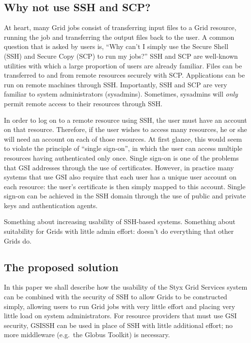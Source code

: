 \documentclass[a4paper]{article}
\begin{document}
\begin{multicols}{2}
\subsection{Why not use SSH and SCP?}
At heart, many Grid jobs consist of transferring input files to a Grid resource, running the job and transferring the output files back to the user.  A common question that is asked by users is, ``Why can't I simply use the Secure Shell (SSH) and Secure Copy (SCP) to run my jobs?''  SSH and SCP are 
well-known utilities with which a large proportion of users are already familiar.  Files can be transferred to and from remote resources securely with SCP.  Applications can be run on remote machines through SSH.  Importantly, SSH and SCP are very familiar to system administrators (sysadmins).  Sometimes, sysadmins will {\em only\/} permit remote access to their resources through SSH.

In order to log on to a remote resource using SSH, the user must have an account on that resource.  Therefore, if the user wishes to access many resources, he or she will need an account on each of those resources.  At first glance, this would seem to violate the principle of ``single sign-on'', in which the user can access multiple resources having authenticated only once.  Single sign-on is one of the problems that GSI addresses through the use of certificates.  However, in practice many systems that use GSI also require that each user has a unique user account on each resource: the user's certificate is then simply mapped to this account.  Single sign-on can be achieved in the SSH domain through the use of public and private keys and authentication agents.

Something about increasing usability of SSH-based systems.  Something about suitability for Grids with little admin effort: doesn't do everything that other Grids do. 

\subsection{The proposed solution}
In this paper we shall describe how the usability of the Styx Grid Services system can be combined with the security of SSH to allow Grids to be constructed simply, allowing users to run Grid jobs with very little effort and placing very little load on system administrators.  For resource providers that must use GSI security, GSISSH can be used in place of SSH with little additional effort; no more middleware (e.g.\ the Globus Toolkit) is necessary.


\end{multicols}
\end{document}

